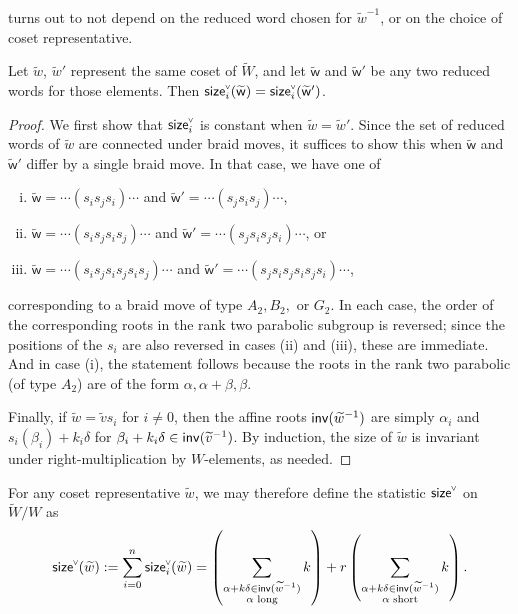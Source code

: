 \documentclass[ALCO,published]{cedram}
\newcommand{\chk}[1]{#1^{\normalfont\smash{\scalebox{.5}[.5]{\rotatebox{90}{\textbf{\textless}}}}}}
\newcommand{\wa}{\widetilde{W}}
\newcommand{\waf}{\widetilde{w}}
\newcommand{\size}{{\sf size}}
\newcommand{\inv}{{\sf inv}}
\begin{document}
 turns out to not depend on the reduced word chosen for $\waf^{-1}$, or on the choice of coset representative.

\begin{prop}
\label{prop:size_welldef}
Let $\waf$, $\waf'$ represent the same coset of $\wa$, and let $\mathsf{\waf}$ and $\mathsf{\waf}'$ be any two reduced words for those elements.  Then $\chk{\size}_i(\mathsf{\waf})=\chk{\size}_i(\mathsf{\waf}')$.
\end{prop}

\begin{proof}
We first show that $\chk{\size}_i$ is constant when $\waf=\waf'$.  Since the set of reduced words of $\waf$ are connected under braid moves, it suffices to show this when $\mathsf{\waf}$ and $\mathsf{\waf}'$ differ by a single braid move.  In that case, we have one of
\begin{enumerate}[(i)]
\item $\mathsf{\waf} = \cdots (s_i s_j s_i) \cdots$ and $\mathsf{\waf}' = \cdots (s_j s_i s_j) \cdots$, 
\item $\mathsf{\waf} = \cdots (s_i s_j s_i s_j) \cdots$ and $\mathsf{\waf}' = \cdots (s_j s_i s_j s_i) \cdots$, or
\item $\mathsf{\waf} = \cdots (s_i s_j s_i s_j s_i s_j) \cdots$ and $\mathsf{\waf}' = \cdots (s_j s_i s_j s_i s_j s_i) \cdots$,
\end{enumerate}
corresponding to a braid move of type $A_2, B_2,$ or $G_2$.  In each case, the order of the corresponding roots in the rank two parabolic subgroup is reversed; since the positions of the $s_i$ are also reversed in cases (ii) and (iii), these are immediate.  And in case (i), the statement follows because the roots in the rank two parabolic (of type $A_2$) are of the form $\alpha,\alpha+\beta,\beta$.

Finally, if $\waf = \widetilde{v}s_i$ for $i\neq 0$, then the affine roots $\inv(\waf^{-1})$ are simply $\alpha_i$ and $s_i(\beta_i)+k_i\delta$ for $\beta_i+k_i\delta\in\inv(\widetilde{v}^{-1})$. By induction, the size of $\waf$ is invariant under right-multiplication by $W$-elements, as needed.
\end{proof}

For any coset representative $\waf$, we may therefore define the statistic $\chk{\size}$ on $\wa/W$ as
\[\chk{\size}(\waf) := \sum_{i=0}^n \chk{\size}_i(\waf) =  \left(\sum_{\substack{\alpha+k\delta \in \mathsf{inv}(\waf^{-1})\\\alpha \text{ long}}}k\right)+r\left(\sum_{\substack{\alpha+k\delta \in \mathsf{inv}(\waf^{-1})\\\alpha \text{ short}}}k\right).\]
\end{document}
